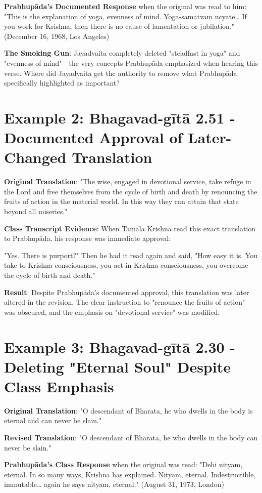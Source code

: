 \documentclass[11pt,twoside]{book}
\begin{document}
\textbf{\textbf{Prabhupāda's Documented Response}} when the original was read to him:
"This is the explanation of yoga, evenness of mind. Yoga-samatvam ucyate\ldots{} If you work for Krishna, then there is no cause of lamentation or jubilation." (December 16, 1968, Los Angeles)

\textbf{\textbf{The Smoking Gun}}: Jayadvaita completely deleted "steadfast in yoga" and "evenness of mind"—the very concepts Prabhupāda emphasized when hearing this verse. Where did Jayadvaita get the authority to remove what Prabhupāda specifically highlighted as important?
\section*{Example 2: Bhagavad-gītā 2.51 - Documented Approval of Later-Changed Translation}
\label{sec:orga9cb57b}

\textbf{\textbf{Original Translation}}: "The wise, engaged in devotional service, take refuge in the Lord and free themselves from the cycle of birth and death by renouncing the fruits of action in the material world. In this way they can attain that state beyond all miseries."

\textbf{\textbf{Class Transcript Evidence}}: When Tamala Krishna read this exact translation to Prabhupāda, his response was immediate approval:

"Yes. There is purport?" Then he had it read again and said, "How easy it is. You take to Krishna consciousness, you act in Krishna consciousness, you overcome the cycle of birth and death." 

\textbf{\textbf{Result}}: Despite Prabhupāda's documented approval, this translation was later altered in the revision. The clear instruction to "renounce the fruits of action" was obscured, and the emphasis on "devotional service" was modified.
\section*{Example 3: Bhagavad-gītā 2.30 - Deleting "Eternal Soul" Despite Class Emphasis}
\label{sec:orge0b607a}

\textbf{\textbf{Original Translation}}: "O descendant of Bharata, he who dwells in the body is eternal and can never be slain."

\textbf{\textbf{Revised Translation}}: "O descendant of Bharata, he who dwells in the body can never be slain."

\textbf{\textbf{Prabhupāda's Class Response}} when the original was read:
"Dehi nityam, eternal. In so many ways, Krishna has explained. Nityam, eternal. Indestructible, immutable\ldots{} again he says nityam, eternal." (August 31, 1973, London)
\end{document}
